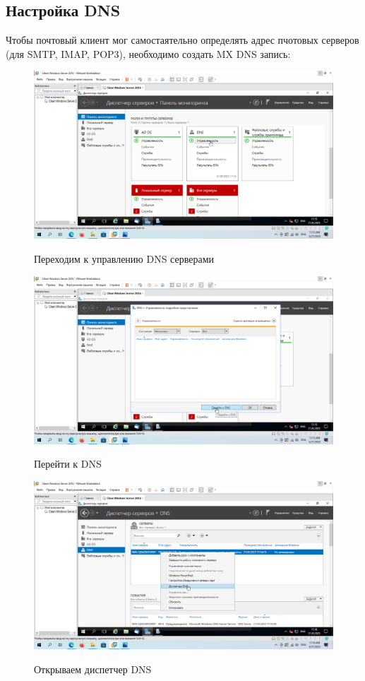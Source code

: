 \documentclass[a4paper]{article}
\begin{document}
  \subsection{Настройка DNS}

  Чтобы почтовый клиент мог самостаятельно определять адрес 
  пчотовых серверов (для SMTP, IMAP, POP3), необходимо создать MX DNS запись:

  \begin{figure}[H]
    \centering
    \includegraphics[width=\textwidth]{11_0070}
    \label{img:70}
    \caption{Переходим к управлению DNS серверами}
  \end{figure}

  \begin{figure}[H]
    \centering
    \includegraphics[width=\textwidth]{11_0071}
    \label{img:71}
    \caption{Перейти к DNS}
  \end{figure}

  \begin{figure}[H]
    \centering
    \includegraphics[width=\textwidth]{11_0072}
    \label{img:72}
    \caption{Открываем диспетчер DNS}
  \end{figure}
\end{document}
